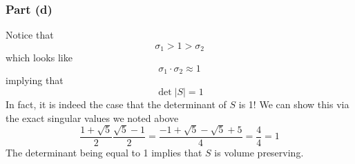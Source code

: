 \documentclass[11pt]{article}
\begin{document}
\subsubsection*{Part (d)}
Notice that
\[
\sigma_1>1>\sigma_2
\]
which looks like 
\[
\sigma_1\cdot \sigma_2 \approx 1
\]
implying that 
\[
\det \lvert S\rvert = 1
\]
In fact, it is indeed the case that the determinant of $S$ is 1! We can show this via the exact singular values we noted above
\[
\frac{1+\sqrt{5}}{2}\frac{\sqrt{5}-1}{2} = \frac{-1 + \sqrt{5}-\sqrt{5}+ 5}{4}= \frac{4}{4}=1
\]
The determinant being equal to 1 implies that $S$ is volume preserving.
\end{document}
